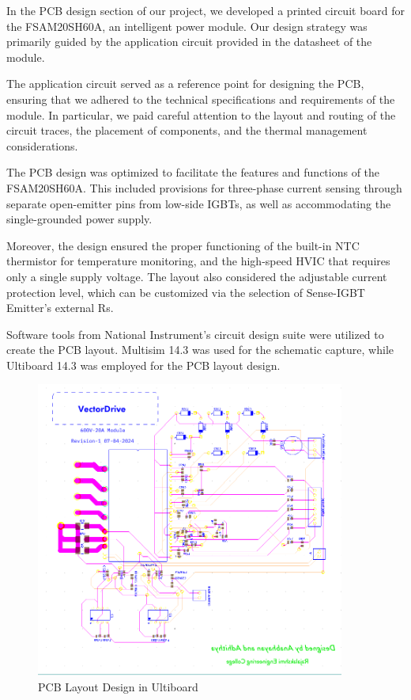 In the PCB design section of our project, we developed a printed circuit board for the FSAM20SH60A, an intelligent power module. Our design strategy was primarily guided by the application circuit provided in the datasheet of the module. 

The application circuit served as a reference point for designing the PCB, ensuring that we adhered to the technical specifications and requirements of the module. In particular, we paid careful attention to the layout and routing of the circuit traces, the placement of components, and the thermal management considerations. 

The PCB design was optimized to facilitate the features and functions of the FSAM20SH60A. This included provisions for three-phase current sensing through separate open-emitter pins from low-side IGBTs, as well as accommodating the single-grounded power supply. 

Moreover, the design ensured the proper functioning of the built-in NTC thermistor for temperature monitoring, and the high-speed HVIC that requires only a single supply voltage. The layout also considered the adjustable current protection level, which can be customized via the selection of Sense-IGBT Emitter's external Rs. 

Software tools from National Instrument's circuit design suite were utilized to create the PCB layout. Multisim 14.3 was used for the schematic capture, while Ultiboard 14.3 was employed for the PCB layout design.

\begin{figure}[H]
	\centering
	\includegraphics[width=4in]{sections/section4/images/PCBDesign/Ultiboard/Ultiboard.png}
	\caption{PCB Layout Design in Ultiboard}
\end{figure}


